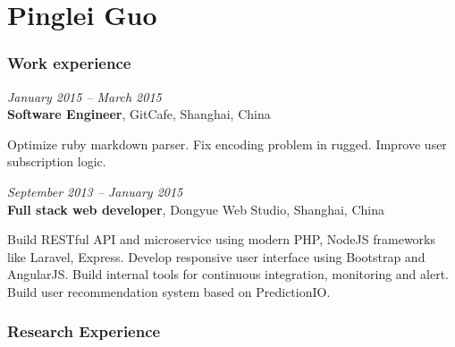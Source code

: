 \documentclass[fontsize=10pt]{tccv}
\begin{document}
\part{Pinglei Guo}

\section{Work experience}

\begin{eventlist}



\textit{January 2015 -- March 2015} \\
\textbf{Software Engineer}, GitCafe, Shanghai, China \smallskip

Optimize ruby markdown parser.
Fix encoding problem in rugged.
Improve user subscription logic.

\medskip


\textit{September 2013 -- January 2015} \\
\textbf{Full stack web developer}, Dongyue Web Studio, Shanghai, China\smallskip

Build RESTful API and microservice using modern PHP, NodeJS frameworks like Laravel, Express.
Develop responsive user interface using Bootstrap and AngularJS.
Build internal tools for continuous integration, monitoring and alert.
Build user recommendation system based on PredictionIO.

\end{eventlist}

\section{Research Experience}
\end{document}
